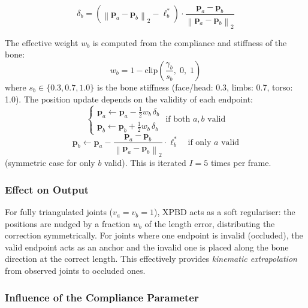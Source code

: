 \documentclass[11pt,a4paper]{article}
\newcommand{\norm}[1]{\left\lVert#1\right\rVert}
\begin{document}
\begin{equation}
  \delta_b = \left(\norm{\mathbf{p}_a - \mathbf{p}_b}_2 - \ell^*_b\right)
             \cdot \frac{\mathbf{p}_a - \mathbf{p}_b}{\norm{\mathbf{p}_a - \mathbf{p}_b}_2}
  \label{eq:xpbd_delta}
\end{equation}

The effective weight $w_b$ is computed from the compliance and stiffness of the bone:
\begin{equation}
  w_b = 1 - \text{clip}\!\left(\frac{\gamma_b}{s_b},\; 0,\; 1\right)
  \label{eq:xpbd_weight}
\end{equation}
where $s_b \in \{0.3, 0.7, 1.0\}$ is the bone stiffness (face/head: 0.3,
limbs: 0.7, torso: 1.0). The position update depends on the validity of each endpoint:
\begin{equation}
  \begin{cases}
    \mathbf{p}_a \leftarrow \mathbf{p}_a - \tfrac{1}{2} w_b \,\delta_b \\
    \mathbf{p}_b \leftarrow \mathbf{p}_b + \tfrac{1}{2} w_b \,\delta_b
  \end{cases}
  \text{ if both } a, b \text{ valid}
  \label{eq:xpbd_both}
\end{equation}
\begin{equation}
  \mathbf{p}_b \leftarrow \mathbf{p}_a
    - \frac{\mathbf{p}_a - \mathbf{p}_b}{\norm{\mathbf{p}_a - \mathbf{p}_b}_2} \cdot \ell^*_b
  \quad\text{if only } a \text{ valid}
  \label{eq:xpbd_chain}
\end{equation}
(symmetric case for only $b$ valid). This is iterated $I = 5$ times per frame.

\subsubsection{Effect on Output}

For fully triangulated joints ($v_a = v_b = 1$), XPBD acts as a soft regulariser:
the positions are nudged by a fraction $w_b$ of the length error, distributing the
correction symmetrically. For joints where one endpoint is invalid (occluded), the
valid endpoint acts as an anchor and the invalid one is placed along the bone direction
at the correct length. This effectively provides \emph{kinematic extrapolation} from
observed joints to occluded ones.

\subsubsection{Influence of the Compliance Parameter}
\end{document}
